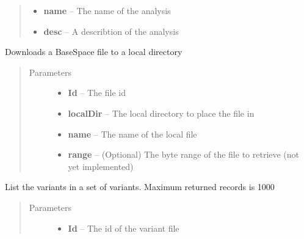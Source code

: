 \documentclass[letterpaper,10pt,english]{sphinxmanual}
\begin{document}
\begin{fulllineitems}
\begin{fulllineitems}
\begin{quote}
\begin{description}
\begin{itemize}
\item {} 
\textbf{name} -- The name of the analysis

\item {} 
\textbf{desc} -- A describtion of the analysis

\end{itemize}

\end{description}\end{quote}

\end{fulllineitems}


\begin{fulllineitems}
\label{Available modules:BaseSpacePy.api.BaseSpaceAPI.BaseSpaceAPI.fileDownload}
Downloads a BaseSpace file to a local directory
\begin{quote}\begin{description}
\item[{Parameters}] \leavevmode\begin{itemize}
\item {} 
\textbf{Id} -- The file id

\item {} 
\textbf{localDir} -- The local directory to place the file in

\item {} 
\textbf{name} -- The name of the local file

\item {} 
\textbf{range} -- (Optional) The byte range of the file to retrieve (not yet implemented)

\end{itemize}

\end{description}\end{quote}

\end{fulllineitems}


\begin{fulllineitems}
\label{Available modules:BaseSpacePy.api.BaseSpaceAPI.BaseSpaceAPI.filterVariantSet}
List the variants in a set of variants. Maximum returned records is 1000
\begin{quote}\begin{description}
\item[{Parameters}] \leavevmode\begin{itemize}
\item {} 
\textbf{Id} -- The id of the variant file


\end{itemize}
\end{description}
\end{quote}
\end{fulllineitems}
\end{fulllineitems}
\end{document}
